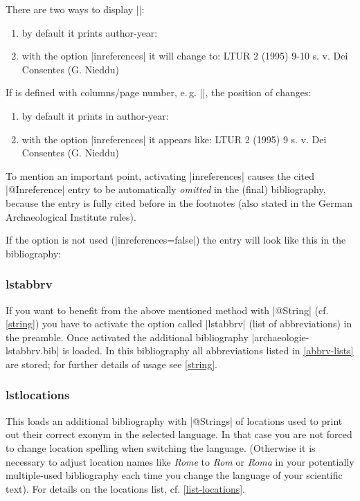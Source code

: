 \documentclass[a4paper,
10pt,
greek,
french,
spanish,
italian,
ngerman,
english
]{ltxdoc}
\begin{document}
\begin{refsection}
There are two ways to display |\cite{Nieddu1995}|:

\begin{bsp}
\begin{enumerate}
\item by default it prints author-year:
\cite{Nieddu1995}
\item with the option |inreferences| it will change to:
LTUR 2 (1995) 9-10 s. v. Dei Consentes (G. Nieddu)
\end{enumerate}
\end{bsp}

If  is defined with columns/page number, e.\,g. |\cite[9]{Nieddu1995}|, 
the position of  changes:

\begin{bsp}
\begin{enumerate} 
\item by default it prints in author-year:
\cite[9]{Nieddu1995}
\item with the option |inreferences| it appears like:
LTUR 2 (1995) 9 s. v. Dei Consentes (G. Nieddu)
\end{enumerate}
\end{bsp}

To mention an important point, activating |inreferences| causes the cited |@Inreference| entry to be automatically \emph{omitted} in the (final) bibliography,
because the entry is fully cited before in the footnotes (also stated in the German Archaeological Institute rules).

If the option is not used (|inreferences=false|) the entry will look like this in the bibliography:
\end{refsection}


\subsubsection{lstabbrv}\label{abbrv}
If you want to benefit from the above mentioned method with |@String| (cf. \cref{string}) 
you have to activate the option called |lstabbrv| (list of abbreviations) in the preamble.
Once activated the additional bibliography |archaeologie-lstabbrv.bib| is loaded. 
In this bibliography all abbreviations listed in \cref{abbrv-lists} are stored; 
for further details of usage see \cref{string}.

\subsubsection{lstlocations}\label{lstlocations}
This loads an additional bibliography with |@Strings| of locations used to print out their correct exonym in the selected language. 
In that case you are not forced to change location spelling when switching the language. 
(Otherwise it is necessary to adjust location names like \emph{Rome} to \emph{Rom} or \emph{Roma} 
in your potentially multiple-used bibliography each time you change the language of your scientific text).
For details on the locations list, cf. \cref{list-locations}.
\end{document}
